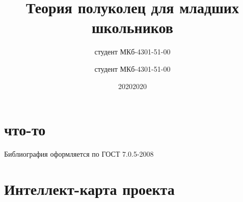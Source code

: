 \documentclass[14pt,Coursework]{diplomwork}
\date{2020}
\author{студент МКб-4301-51-00}{Фамилых Имярек Батькович}
\title{Теория полуколец для младших школьников}
\date{2020}
\author{студент МКб-4301-51-00}{Фамилых Имярек Батькович}
\institute{математики и информационных систем}
\newcommand{\alert}[1]{{\color{red}#1}}
\begin{document}
\maketitle
\newpage

\tableofcontents


\chapter{что-то }
\begin{thebibliography}{99}
{} \alert{Библиография оформляется по ГОСТ 7.0.5-2008} 

\end{thebibliography}

\APPENDIX
\chapter{Интеллект-карта проекта}
\end{document}
